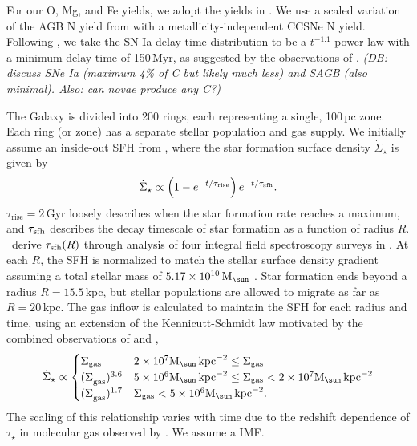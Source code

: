 \documentclass[fleqn,
usenatbib]{mnras}
\newcommand{\JJ}{\citetalias{james+21}}
\newcommand{\ia}{SN Ia}
\newcommand{\Mo}{ {\rm M}_{\sun}}
\newcommand{\dbnote}[1]{ {\color{Thistle} \textit{\small (DB: #1)}} }
\begin{document}
For our O, Mg, and Fe yields, we adopt the yields in \citet{david_fe}. We use a scaled variation of the AGB N yield from \citet{james+23} with a metallicity-independent CCSNe N yield. 
Following \citet{james+21, james+23}, we take the \ia{} delay time distribution to be a $t^{-1.1}$ power-law with a minimum delay time of 150\,Myr, as suggested by the observations of \citet{maoz+12}. 
\dbnote{discuss SNe Ia (maximum 4\% of C but likely much less) and SAGB (also minimal). Also: can novae produce any C?}


The Galaxy is divided into 200 rings, each representing a single, 100\,pc zone. Each ring (or zone) has a separate stellar population and gas supply. We initially assume an inside-out SFH from \JJ, where the star formation surface density $\dot{\Sigma}_\star$ is given by 
\begin{equation}\label{eq:inside_out}
    \dot{\Sigma}_\star \propto \left(1-e^{-t/\tau_{\rm rise}}\right) e^{-t/\tau_{\rm sfh}}.
\end{equation}
$\tau_\text{rise}=2$\,Gyr loosely describes when the star formation rate reaches a maximum, and $\tau_{\rm sfh}$ describes the decay timescale of star formation as a function of radius $R$. \JJ\ derive $\tau_{\rm sfh}(R)$ through analysis of four integral field spectroscopy surveys in \cite{sanches20}. At each $R$, the SFH is normalized to match the stellar surface density gradient \citep{BHG16} assuming a total stellar mass of $5.17\times10^{10}\,\Mo$ \citep{LM15}. Star formation ends beyond a radius $R=15.5\,$kpc, but stellar populations are allowed to migrate as far as $R=20\,$kpc.  
The gas inflow is calculated to maintain the SFH for each radius and time, using an extension of the Kennicutt-Schmidt law \citep{kennicutt98} motivated by the combined observations of \citet{bigiel+10} and \citet{leroy+13}, 
\begin{equation}
\dot{\Sigma}_{\star} \propto 
\begin{cases}
    {\Sigma}_{\rm gas} & 2\times 10^7 \Mo\,{\rm kpc}^{-2} \leq \Sigma_{\rm gas} \\ 
    {(\Sigma}_{\rm gas})^{3.6} & 5\times 10^6 \Mo\,{\rm kpc}^{-2}\leq \Sigma_{\rm gas} < 2\times10^7 \Mo\,{\rm kpc}^{-2}\\ 
    {(\Sigma}_{\rm gas})^{1.7} & \Sigma_{\rm gas} < 5\times10^6 \Mo\,{\rm kpc}^{-2}.
\end{cases}
\end{equation} 
The scaling of this relationship varies with time due to the redshift dependence of $\tau_\star$ in molecular gas observed by \citet{tacconi18}. We assume a \citet{kroupa01} IMF.
\end{document}
